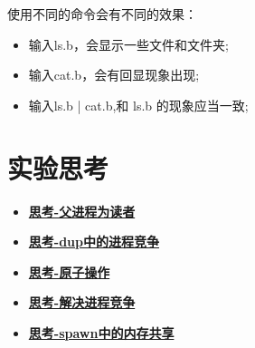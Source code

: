 使用不同的命令会有不同的效果：
\begin{itemize}
	\item 输入ls.b，会显示一些文件和文件夹;
	\item 输入cat.b，会有回显现象出现;
	\item 输入ls.b | cat.b,和 ls.b 的现象应当一致;
\end{itemize}

\section{实验思考}

\begin{itemize}
	\item \hyperref[think-father-reader]{\textbf{\textcolor{baseB}{思考-父进程为读者}}}
	\item \hyperref[think-dup]{\textbf{\textcolor{baseB}{思考-dup中的进程竞争}}}
	\item \hyperref[think-automatic]{\textbf{\textcolor{baseB}{思考-原子操作}}}
	\item \hyperref[think-race]{\textbf{\textcolor{baseB}{思考-解决进程竞争}}}
	\item \hyperref[think-spawn]{\textbf{\textcolor{baseB}{思考-spawn中的内存共享}}}
\end{itemize}





